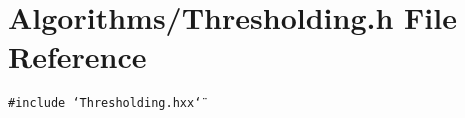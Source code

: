 \section{Algorithms/Thresholding.h File Reference}
\label{Thresholding_8h}
{\tt \#include \char`\"{}Thresholding.hxx\char`\"{}}\par
